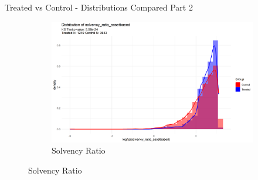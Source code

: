 \documentclass{beamer}
\begin{document}
\begin{frame}{Treated vs Control - Distributions Compared Part 2}
\begin{figure}[ht]
\begin{subfigure}[b]{0.45\textwidth}
        \end{subfigure}
        \vspace{0.5cm}
        \begin{subfigure}[b]{0.45\textwidth}
            \centering
            \includegraphics[width=\linewidth]{../Output/distrib_compare_solvency_ratio_assetbased_allcountries.png}
            \caption{Solvency Ratio}
        \end{subfigure}
    \end{figure}
\end{frame}
\end{document}
